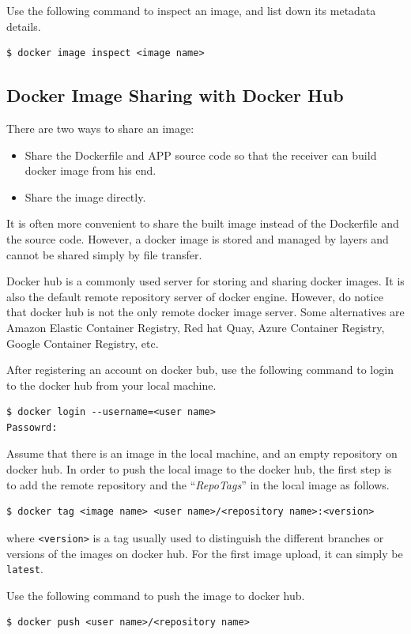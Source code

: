 Use the following command to inspect an image, and list down its metadata details.
\begin{lstlisting}
$ docker image inspect <image name>
\end{lstlisting}

\subsection{Docker Image Sharing with Docker Hub}

There are two ways to share an image:
\begin{itemize}
	\item Share the Dockerfile and APP source code so that the receiver can build docker image from his end.
	\item Share the image directly.
\end{itemize}
It is often more convenient to share the built image instead of the Dockerfile and the source code. However, a docker image is stored and managed by layers and cannot be shared simply by file transfer. 

Docker hub is a commonly used server for storing and sharing docker images. It is also the default remote repository server of docker engine. However, do notice that docker hub is not the only remote docker image server. Some alternatives are Amazon Elastic Container Registry, Red hat Quay, Azure Container Registry, Google Container Registry, etc.

After registering an account on docker bub, use the following command to login to the docker hub from your local machine.
\begin{lstlisting}
$ docker login --username=<user name>
Passowrd:
\end{lstlisting}

Assume that there is an image in the local machine, and an empty repository on docker hub. In order to push the local image to the docker hub, the first step is to add the remote repository and the ``\textit{RepoTags}'' in the local image as follows.
\begin{lstlisting}
$ docker tag <image name> <user name>/<repository name>:<version>
\end{lstlisting}
where \verb|<version>| is a tag usually used to distinguish the different branches or versions of the images on docker hub. For the first image upload, it can simply be \verb|latest|.

Use the following command to push the image to docker hub.
\begin{lstlisting}
$ docker push <user name>/<repository name>
\end{lstlisting}

